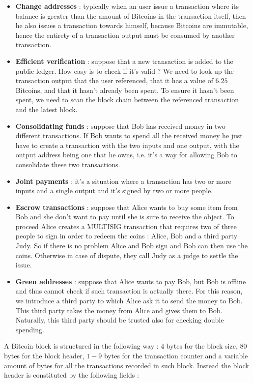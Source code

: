 \begin{itemize}
\item \textbf{Change addresses} : typically when an user issue a transaction where its balance is greater than the amount of Bitcoins in the transaction itself, then he also issues a transaction towards himself, because Bitcoins are immutable, hence the entirety of a transaction output must be consumed by another transaction.
\item \textbf{Efficient verification} : suppose that a new transaction is added to the public ledger. How easy is to check if it's valid ? We need to look up the transaction output that the user referenced, that it has a value of $6.25$ Bitcoins, and that it hasn't already been spent. To ensure it hasn't been spent, we need to scan the block chain between the referenced transaction and the latest block.
\item \textbf{Consolidating funds} : suppose that Bob has received money in two different transactions. If Bob wants to spend all the received money he just have to create a transaction with the two inputs and one output, with the output address being one that he owns, i.e. it's a way for allowing Bob to consolidate these two transactions.
\item \textbf{Joint payments} : it's a situation where a transaction has two or more inputs and a single output and it's signed by two or more people.
\item \textbf{Escrow transactions} : suppose that Alice wants to buy some item from Bob and she don't want to pay until she is sure to receive the object. To proceed Alice creates a MULTISIG transaction that requires two of three people to sign in order to redeem the coins : Alice, Bob and a third party Judy. So if there is no problem Alice and Bob sign and Bob can then use the coins. Otherwise in case of dispute, they call Judy as a judge to settle the issue.
\item \textbf{Green addresses} : suppose that Alice wants to pay Bob, but Bob is offline and thus cannot check if such transaction is actually there. For this reason, we introduce a third party to which Alice ask it to send the money to Bob. This third party takes the money from Alice and gives them to Bob. Naturally, this third party should be trusted also for checking double spending.
\end{itemize}
A Bitcoin block is structured in the following way : $4$ bytes for the block size, $80$ bytes for the block header, $1-9$ bytes for the transaction counter and a variable amount of bytes for all the transactions recorded in such block. Instead the block header is constituted by the following fields :
